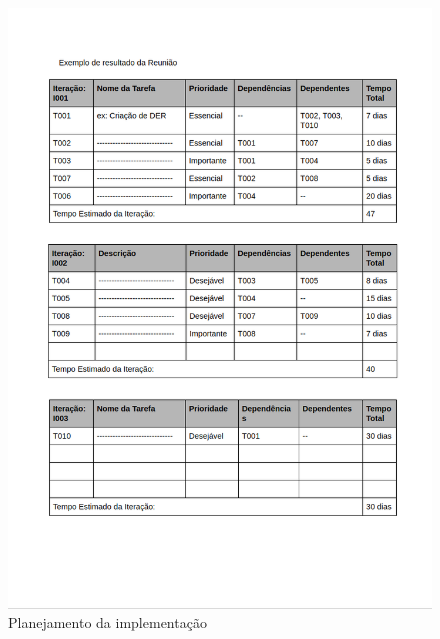 \documentclass[	DIV=calc,%
							paper=a4,%
							fontsize=12pt,%
							onecolumn]{scrartcl}	 					%
\begin{document}
\begin{figure}
	\centering
	\includegraphics[width=\textwidth]{4-2.png}
	\caption{Planejamento da implementação}
	\label{Figura 5}
\end{figure}
\end{document}

